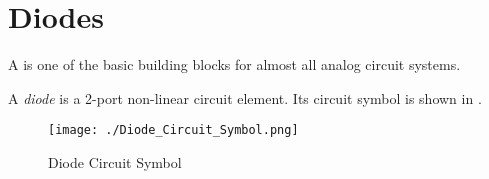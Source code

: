 \section{Diodes}\label{sec:Diodes}
A  is one of the basic building blocks for almost all analog circuit systems.

\begin{definition}[Diode]\label{def:Diode}
  A \emph{diode} is a 2-port non-linear circuit element.
  Its circuit symbol is shown in .
\end{definition}

\begin{figure}[h!tbp]
  \centering
  \texttt{[image: ./Diode\_Circuit\_Symbol.png]}
  \caption{Diode Circuit Symbol \parencite[p.~177]{sedraTextbook7}}
  \label{fig:Diode_Circuit_Symbol}
\end{figure}


